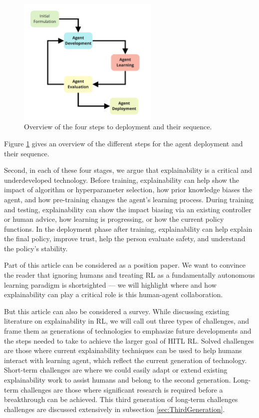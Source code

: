 \documentclass[twoside,11pt]{article}
\begin{document}
\begin{figure}[h]
    \centering
    \includegraphics[width=0.6\textwidth]{img/HITL_Deployment_Workflow.pdf}
    \caption{Overview of the four steps to deployment and their sequence.}
    \label{fig:Deployment_Workflow}
\end{figure}

Figure \ref{fig:Deployment_Workflow} gives an overview of the different steps for the agent deployment and their sequence.

Second, in each of these four stages, we argue that explainability is a critical and underdeveloped technology. Before training, explainability can help show the impact of algorithm or hyperparameter selection, how prior knowledge biases the agent, and how pre-training changes the agent's learning process. During training and testing, explainability can show the impact biasing via an existing controller or human advice, how learning is progressing, or how the current policy functions. In the deployment phase after training, explainability can help explain the final policy, improve trust, help the person evaluate safety, and understand the policy's stability.

Part of this article can be considered as a position paper. We want to convince the reader that ignoring humans and treating RL as a fundamentally autonomous learning paradigm is shortsighted --- we will highlight where and how explainability can play a critical role is this human-agent collaboration. 

But this article can also be considered a survey. While discussing existing literature on explainability in RL, we will call out three types of challenges, and frame them as generations of technologies to emphasize future developments and the steps needed to take to achieve the larger goal of HITL RL. Solved challenges are those where current explainability techniques can be used to help humans interact with learning agent, which reflect the current generation of technology. Short-term challenges are where we could easily adapt or extend existing explainability work to assist humans and belong to the second generation. Long-term challenges are those where significant research is required before a breakthrough can be achieved. This third generation of long-term challenges challenges are discussed extensively in subsection \ref{sec:ThirdGeneration}.
\end{document}
